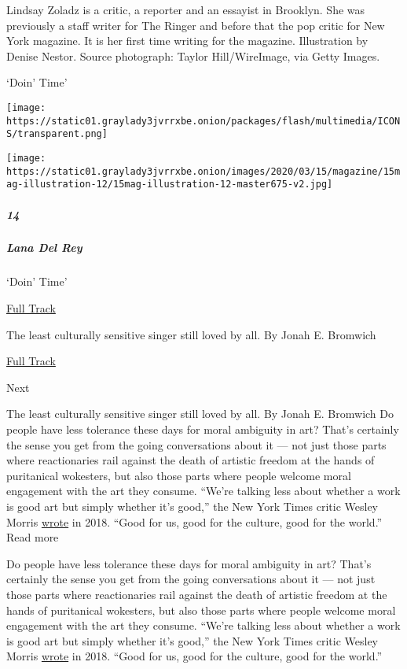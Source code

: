 Lindsay Zoladz is a critic, a reporter and an essayist in Brooklyn. She
was previously a staff writer for The Ringer and before that the pop
critic for New York magazine. It is her first time writing for the
magazine. Illustration by Denise Nestor. Source photograph: Taylor
Hill/WireImage, via Getty Images.

`Doin' Time'

\texttt{[image: https://static01.graylady3jvrrxbe.onion/packages/flash/multimedia/ICONS/transparent.png]}

\texttt{[image: https://static01.graylady3jvrrxbe.onion/images/2020/03/15/magazine/15mag-illustration-12/15mag-illustration-12-master675-v2.jpg]}

\hypertarget{14}{%
\subparagraph{14}\label{14}}

\hypertarget{lana-del-rey}{%
\subparagraph{Lana Del Rey}\label{lana-del-rey}}

`Doin' Time'

\href{https://open.spotify.com/track/0Oqc0kKFsQ6MhFOLBNZIGX?si=6QMxgD2LSVCiWTrGx5r1SQ}{
Full Track}

The least culturally sensitive singer still loved by all. By Jonah E.
Bromwich

\href{https://open.spotify.com/track/0Oqc0kKFsQ6MhFOLBNZIGX?si=6QMxgD2LSVCiWTrGx5r1SQ}{Full
Track }

Next

The least culturally sensitive singer still loved by all. By Jonah E.
Bromwich Do people have less tolerance these days for moral ambiguity in
art? That's certainly the sense you get from the going conversations
about it --- not just those parts where reactionaries rail against the
death of artistic freedom at the hands of puritanical wokesters, but
also those parts where people welcome moral engagement with the art they
consume. ``We're talking less about whether a work is good art but
simply whether it's good,'' the New York Times critic Wesley Morris
\href{https://www.nytimes3xbfgragh.onion/interactive/2018/10/03/magazine/morality-social-justice-art-entertainment.html}{wrote}
in 2018. ``Good for us, good for the culture, good for the world.'' Read
more

Do people have less tolerance these days for moral ambiguity in art?
That's certainly the sense you get from the going conversations about it
--- not just those parts where reactionaries rail against the death of
artistic freedom at the hands of puritanical wokesters, but also those
parts where people welcome moral engagement with the art they consume.
``We're talking less about whether a work is good art but simply whether
it's good,'' the New York Times critic Wesley Morris
\href{https://www.nytimes3xbfgragh.onion/interactive/2018/10/03/magazine/morality-social-justice-art-entertainment.html}{wrote}
in 2018. ``Good for us, good for the culture, good for the world.''

